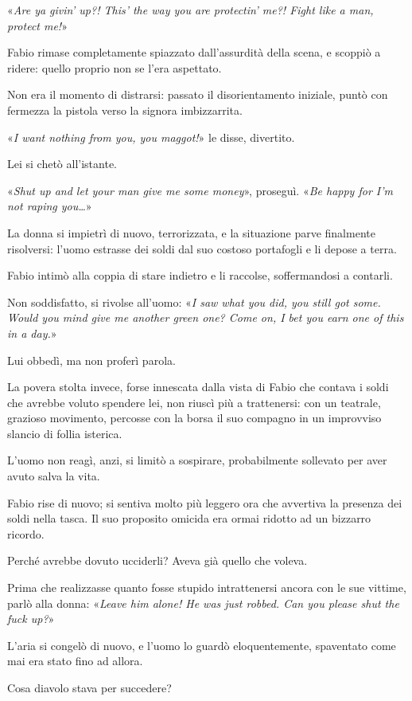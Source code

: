 «\textit{Are ya givin' up?! This' the way you are protectin' me?! Fight like a man, protect me!}»

Fabio rimase completamente spiazzato dall'assurdità della scena, e scoppiò a ridere: quello proprio non se l'era aspettato. 

Non era il momento di distrarsi: passato il disorientamento iniziale, puntò con fermezza la pistola verso la signora imbizzarrita.

«\textit{I want nothing from you, you maggot!}» le disse, divertito.

Lei si chetò all'istante.

«\textit{Shut up and let your man give me some money}», proseguì. «\textit{Be happy for I'm not raping you\ldots}»

La donna si impietrì di nuovo, terrorizzata, e la situazione parve finalmente risolversi: l'uomo estrasse dei soldi dal suo costoso portafogli e li depose a terra. 

Fabio intimò alla coppia di stare indietro e li raccolse, soffermandosi a contarli.

Non soddisfatto, si rivolse all'uomo: «\textit{I saw what you did, you still got some. Would you mind give me another green one? Come on, I bet you earn one of this in a day.}»

Lui obbedì, ma non proferì parola. 

La povera stolta invece, forse innescata dalla vista di Fabio che contava i soldi che avrebbe voluto spendere lei, non riuscì più a trattenersi: con un teatrale, grazioso movimento, percosse con la borsa il suo compagno in un improvviso slancio di follia isterica. 

L'uomo non reagì, anzi, si limitò a sospirare, probabilmente sollevato per aver avuto salva la vita. 

Fabio rise di nuovo; si sentiva molto più leggero ora che avvertiva la presenza dei soldi nella tasca. Il suo proposito omicida era ormai ridotto ad un bizzarro ricordo. 

Perché avrebbe dovuto ucciderli? Aveva già quello che voleva.

Prima che realizzasse quanto fosse stupido intrattenersi ancora con le sue vittime, parlò alla donna: «\textit{Leave him alone! He was just robbed. Can you please shut the fuck up?}»

L'aria si congelò di nuovo, e l'uomo lo guardò eloquentemente, spaventato come mai era stato fino ad allora.

Cosa diavolo stava per succedere? 

